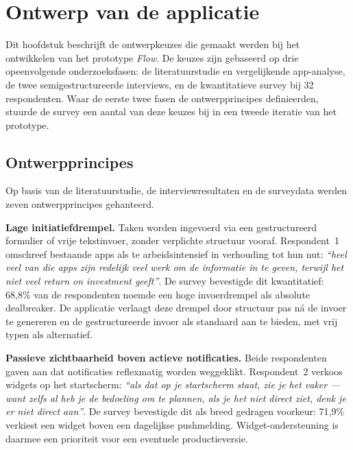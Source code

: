 
\chapter{Ontwerp van de applicatie}%
\label{ch:ontwerp}

Dit hoofdstuk beschrijft de ontwerpkeuzes die gemaakt werden bij het
ontwikkelen van het prototype \textit{Flow}. De keuzes zijn gebaseerd op drie
opeenvolgende onderzoeksfasen: de literatuurstudie en vergelijkende app-analyse,
de twee semigestructureerde interviews, en de kwantitatieve survey bij 32
respondenten. Waar de eerste twee fasen de ontwerpprincipes definieerden, stuurde
de survey een aantal van deze keuzes bij in een tweede iteratie van het prototype.

\section{Ontwerpprincipes}

Op basis van de literatuurstudie, de interviewresultaten en de surveydata werden
zeven ontwerpprincipes gehanteerd.

\textbf{Lage initiatiefdrempel.}
Taken worden ingevoerd via een gestructureerd formulier of vrije tekstinvoer,
zonder verplichte structuur vooraf. Respondent~1 omschreef bestaande apps als te
arbeidsintensief in verhouding tot hun nut: \textit{``heel veel van die apps zijn
redelijk veel werk om de informatie in te geven, terwijl het niet veel return on
investment geeft''}. De survey bevestigde dit kwantitatief: 68,8\% van de
respondenten noemde een hoge invoerdrempel als absolute dealbreaker. De applicatie
verlaagt deze drempel door structuur pas ná de invoer te genereren en de
gestructureerde invoer als standaard aan te bieden, met vrij typen als
alternatief.

\textbf{Passieve zichtbaarheid boven actieve notificaties.}
Beide respondenten gaven aan dat notificaties reflexmatig worden weggeklikt.
Respondent~2 verkoos widgets op het startscherm: \textit{``als dat op je
startscherm staat, zie je het vaker — want zelfs al heb je de bedoeling om te
plannen, als je het niet direct ziet, denk je er niet direct aan''}. De survey
bevestigde dit als breed gedragen voorkeur: 71,9\% verkiest een widget boven een
dagelijkse pushmelding. Widget-ondersteuning is daarmee een prioriteit voor een
eventuele productieversie.

